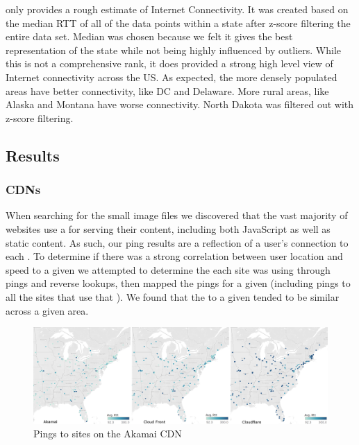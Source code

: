  

 only provides a rough estimate of Internet Connectivity. It was created based on the median RTT of all of the data points within a state after z-score filtering the entire data set. Median was chosen because we felt it gives the best representation of the state while not being highly influenced by outliers. While this is not a comprehensive rank, it does provided a strong high level view of Internet connectivity across the US. As expected, the more densely populated areas have better connectivity, like DC and Delaware. More rural areas, like Alaska and Montana have worse connectivity. North Dakota was filtered out with z-score filtering.

\subsection{Results}

\subsubsection{CDNs}
When searching for the small image files we discovered that the vast majority of websites use a \cdn for serving their content, including both JavaScript as well as static content. As such, our ping results are a reflection of a user's connection to each \cdn. To determine if there was a strong correlation between user location and speed to a given \cdn we attempted to determine the \cdn each site was using through \icmp pings and reverse \dns lookups, then mapped the pings for a given \cdn (including pings to all the sites that use that \cdn). We found that the \rtt to a given \cdn tended to be similar across a given area.

\begin{figure}[htb]
    \centering
    \includegraphics[width=1\textwidth]{images/siteping/cdn_combined.png}
    \caption{Pings to sites on the Akamai CDN} %
    \label{fig:akamai_cdn}
\end{figure}

